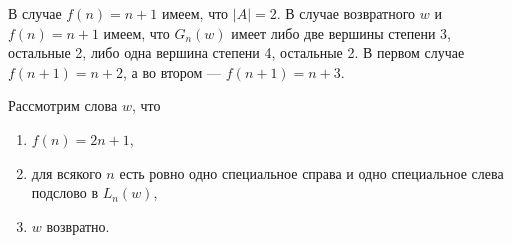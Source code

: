 \documentclass[12pt,a4paper]{article}
\begin{document}
    \begin{theorem}
        В случае $f(n) = n+1$ имеем, что $|A| = 2$. В случае возвратного $w$ и $f(n) = n+1$ имеем, что $G_n(w)$ имеет либо две вершины степени 3, остальные 2, либо одна вершина степени 4, остальные 2. В первом случае $f(n+1) = n+2$, а во втором --- $f(n+1) = n+3$.
    \end{theorem}

    Рассмотрим слова $w$, что
    \begin{enumerate}
        \item $f(n) = 2n+1$,
        \item для всякого $n$ есть ровно одно специальное справа и одно специальное слева подслово в $L_n(w)$,
        \item $w$ возвратно.
    \end{enumerate}
\end{document}

